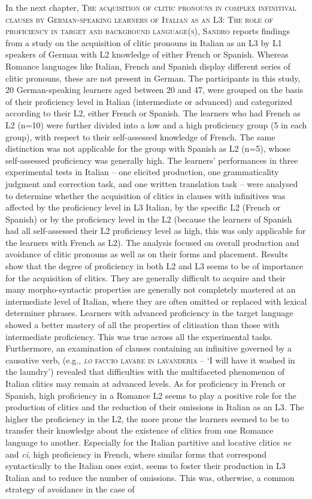 \documentclass[output=paper,colorlinks,citecolor=brown,nonflat]{langsci/langscibook}
\begin{document}
In the next chapter, \textsc{The acquisition of clitic pronouns in complex infinitival clauses by German-speaking learners of Italian as an L3: The role of proficiency in target and background language(s), Sandro \citeauthor{chapters/sciutti}} reports findings from a study on the acquisition of clitic pronouns in Italian as an L3 by L1 speakers of German with L2 knowledge of either French or Spanish. Whereas Romance languages like Italian, French and Spanish display different series of clitic pronouns, these are not present in German. The participants in this study, 20 German-speaking learners aged between 20 and 47, were grouped on the basis of their proficiency level in Italian (intermediate or advanced) and categorized according to their L2, either French or Spanish. The learners who had French as L2 (n=10) were further divided into a low and a high proficiency group (5 in each group), with respect to their self-assessed knowledge of French. The same distinction was not applicable for the group with Spanish as L2 (n=5), whose self-assessed proficiency was generally high. The learners’ performances in three experimental tests in Italian – one elicited production, one grammaticality judgment and correction task, and one written translation task – were analysed to determine whether the acquisition of clitics in clauses with infinitives was affected by the proficiency level in L3 Italian, by the specific L2 (French or Spanish) or by the proficiency level in the L2 (because the learners of Spanish had all self-assessed their L2 proficiency level as high, this was only applicable for the learners with French as L2). The analysis focused on overall production and avoidance of clitic pronouns as well as on their forms and placement. Results show that the degree of proficiency in both L2 and L3 seems to be of importance for the acquisition of clitics. They are generally difficult to acquire and their many morpho-syntactic properties are generally not completely mastered at an intermediate level of Italian, where they are often omitted or replaced with lexical determiner phrases. Learners with advanced proficiency in the target language showed a better mastery of all the properties of clitisation than those with intermediate proficiency. This was true across all the experimental tasks. Furthermore, an examination of clauses containing an infinitive governed by a causative verb, (e.g., \textsc{\textit{lo} faccio lavare in lavanderia} – ‘I will have it washed in the laundry’) revealed that difficulties with the multifaceted phenomenon of Italian clitics may remain at advanced levels. As for proficiency in French or Spanish, high proficiency in a Romance L2 seems to play a positive role for the production of clitics and the reduction of their omissions in Italian as an L3. The higher the proficiency in the L2, the more prone the learners seemed to be to transfer their knowledge about the existence of clitics from one Romance language to another. Especially for the Italian partitive and locative clitics \textit{ne} and \textit{ci}, high proficiency in French, where similar forms that correspond syntactically to the Italian ones exist, seems to foster their production in L3 Italian and to reduce the number of omissions. This was, otherwise, a common strategy of avoidance in the case of 
\end{document}
